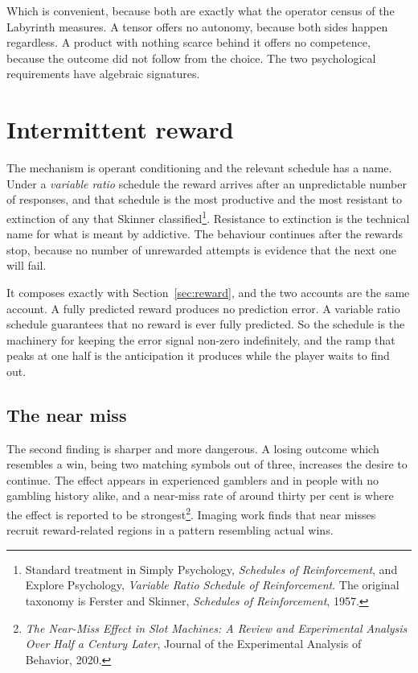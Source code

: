 \documentclass[11pt,a4paper]{article}
\begin{document}
\begin{sectionbox}
Which is convenient, because both are exactly what the operator census of the Labyrinth
measures. A tensor offers no autonomy, because both sides happen regardless. A product with
nothing scarce behind it offers no competence, because the outcome did not follow from the
choice. The two psychological requirements have algebraic signatures.
\end{sectionbox}

\section{Intermittent reward}
\label{sec:intermittent}

The mechanism is operant conditioning and the relevant schedule has a name. Under a
\emph{variable ratio} schedule the reward arrives after an unpredictable number of responses, and
that schedule is the most productive and the most resistant to extinction of any that
Skinner classified\footnote{Standard treatment in Simply Psychology, \emph{Schedules of
Reinforcement}, and Explore Psychology, \emph{Variable Ratio Schedule of Reinforcement}. The
original taxonomy is Ferster and Skinner, \emph{Schedules of Reinforcement}, 1957.}. Resistance to
extinction is the technical name for what is meant by addictive. The behaviour continues after
the rewards stop, because no number of unrewarded attempts is evidence that the next one will
fail.

It composes exactly with Section~\ref{sec:reward}, and the two accounts are the same account. A
fully predicted reward produces no prediction error. A variable ratio schedule guarantees that no
reward is ever fully predicted. So the schedule is the machinery for keeping the error signal
non-zero indefinitely, and the ramp that peaks at one half is the anticipation it produces while
the player waits to find out.

\subsection{The near miss}

The second finding is sharper and more dangerous. A losing outcome which resembles a win, being
two matching symbols out of three, increases the desire to continue. The effect appears in
experienced gamblers and in people with no gambling history alike, and a near-miss rate of
around thirty per cent is where the effect is reported to be
strongest\footnote{\emph{The Near-Miss Effect in Slot Machines: A Review and Experimental Analysis
Over Half a Century Later}, Journal of the Experimental Analysis of Behavior, 2020.}. Imaging work
finds that near misses recruit reward-related regions in a pattern resembling actual wins.
\end{document}
